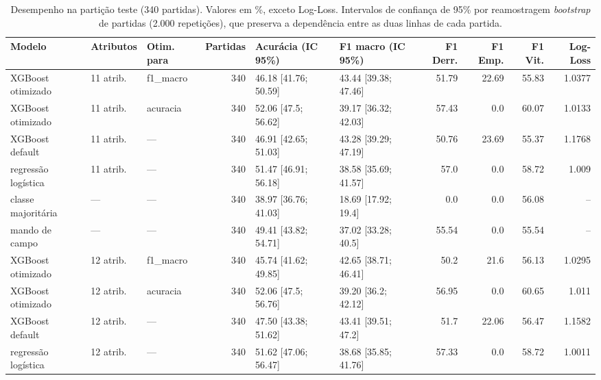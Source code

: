 \begin{table}[htbp]
\centering
\caption{Desempenho na partição teste (340 partidas). Valores em \%, exceto Log-Loss. Intervalos de confiança de 95\% por reamostragem \emph{bootstrap} de partidas (2.000 repetições), que preserva a dependência entre as duas linhas de cada partida.}
\label{tab:wp3-teste}
\small
\begin{tabular}{lllrllrrrr}
\toprule
Modelo & Atributos & Otim. para & Partidas & Acurácia (IC 95\%) & F1 macro (IC 95\%) & F1 Derr. & F1 Emp. & F1 Vit. & Log-Loss \\
\midrule
XGBoost otimizado & 11 atrib. & f1\_macro & 340 & 46.18 [41.76; 50.59] & 43.44 [39.38; 47.46] & 51.79 & 22.69 & 55.83 & 1.0377 \\
XGBoost otimizado & 11 atrib. & acuracia & 340 & 52.06 [47.5; 56.62] & 39.17 [36.32; 42.03] & 57.43 & 0.0 & 60.07 & 1.0133 \\
XGBoost default & 11 atrib. & — & 340 & 46.91 [42.65; 51.03] & 43.28 [39.29; 47.19] & 50.76 & 23.69 & 55.37 & 1.1768 \\
regressão logística & 11 atrib. & — & 340 & 51.47 [46.91; 56.18] & 38.58 [35.69; 41.57] & 57.0 & 0.0 & 58.72 & 1.009 \\
classe majoritária & — & — & 340 & 38.97 [36.76; 41.03] & 18.69 [17.92; 19.4] & 0.0 & 0.0 & 56.08 & -- \\
mando de campo & — & — & 340 & 49.41 [43.82; 54.71] & 37.02 [33.28; 40.5] & 55.54 & 0.0 & 55.54 & -- \\
XGBoost otimizado & 12 atrib. & f1\_macro & 340 & 45.74 [41.62; 49.85] & 42.65 [38.71; 46.41] & 50.2 & 21.6 & 56.13 & 1.0295 \\
XGBoost otimizado & 12 atrib. & acuracia & 340 & 52.06 [47.5; 56.76] & 39.20 [36.2; 42.12] & 56.95 & 0.0 & 60.65 & 1.011 \\
XGBoost default & 12 atrib. & — & 340 & 47.50 [43.38; 51.62] & 43.41 [39.51; 47.2] & 51.7 & 22.06 & 56.47 & 1.1582 \\
regressão logística & 12 atrib. & — & 340 & 51.62 [47.06; 56.47] & 38.68 [35.85; 41.76] & 57.33 & 0.0 & 58.72 & 1.0011 \\
\bottomrule
\end{tabular}
\end{table}
